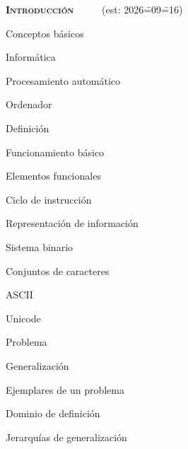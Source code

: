 \begin{longenum}
    \item \textbf{\textsc{Introducción}} \ \ \ \ \ (est: 2026\==09\==16)
    \begin{longenum}
        \item Conceptos básicos
        \begin{longenum}
            \item Informática
            \begin{longenum}
                \item Procesamiento automático
            \end{longenum}
            \item Ordenador
            \begin{longenum}
                \item Definición
                \item Funcionamiento básico
                \begin{longenum}
                    \item Elementos funcionales
                    \item Ciclo de instrucción
                \end{longenum}
                \item Representación de información
                \begin{longenum}
                    \item Sistema binario
                    \item Conjuntos de caracteres
                    \begin{longenum}
                        \item ASCII
                        \item Unicode
                    \end{longenum}
                \end{longenum}
            \end{longenum}
            \item Problema
            \begin{longenum}
                \item Generalización
                \item Ejemplares de un problema
                \item Dominio de definición
                \item Jerarquías de generalización
            \end{longenum}

\end{longenum}
\end{longenum}
\end{longenum}
